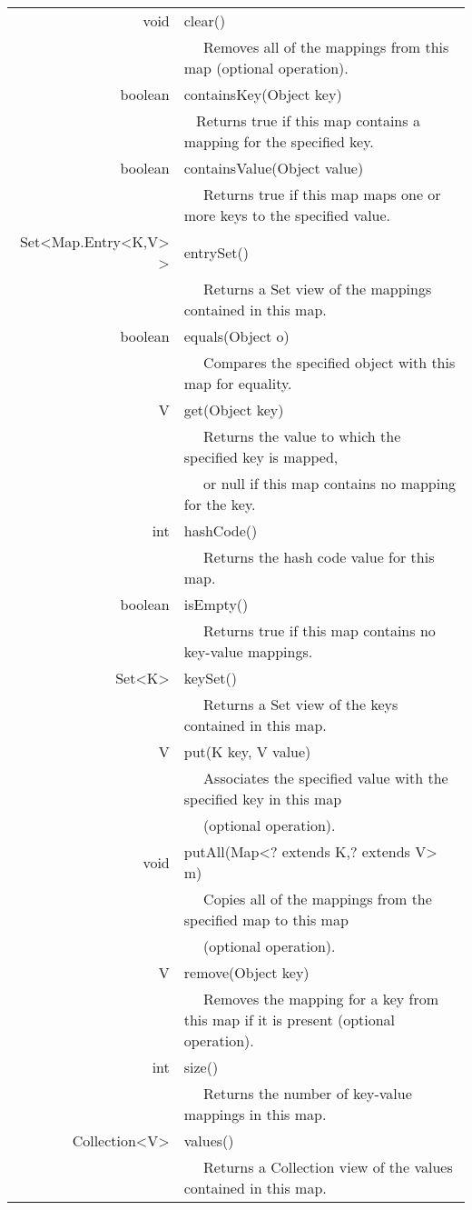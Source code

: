 \documentclass[iutinfo,a4paper,nocorrections,10pt]{ustl-tdtp}
\begin{document}
\begin{center}
\begin{tabular}{|r|l|}
\hline
 void	& clear() \\
        &~~  Removes all of the mappings from this map (optional operation).\\
 \hline
boolean&	containsKey(Object key) \\
        &~  Returns true if this map contains a mapping for the specified key.\\
\hline
 boolean&	containsValue(Object value) \\
        &~~  Returns true if this map maps one or more keys to the specified value.\\
\hline
 Set<Map.Entry<K,V> >&	entrySet() \\
        &~~  Returns a Set view of the mappings contained in this map.\\
\hline
 boolean&	equals(Object o) \\
        &~~  Compares the specified object with this map for equality.\\
\hline
 V	&get(Object key) \\
        &~~ Returns the value to which the specified key is mapped,\\
        &~~ or null if this map contains no mapping for the key.\\
\hline
 int	&hashCode() \\
        &~~  Returns the hash code value for this map.\\
\hline
 boolean&	isEmpty() \\
        &~~  Returns true if this map contains no key-value mappings.\\
\hline
 Set<K>	&keySet() \\
        &~~  Returns a Set view of the keys contained in this map.\\
\hline
 V	&put(K key, V value) \\
        &~~  Associates the specified value with the specified key in this map \\
        &~~ (optional operation).\\
\hline
 void	&putAll(Map<? extends K,? extends V> m) \\
        &~~  Copies all of the mappings from the specified map to this map\\
        &~~ (optional operation).\\
\hline
 V	&remove(Object key) \\
        &~~  Removes the mapping for a key from this map if it is present (optional operation).\\
\hline
 int	&size() \\
        &~~  Returns the number of key-value mappings in this map.\\
\hline
 Collection<V>&	values() \\
          &~~ Returns a Collection view of the values contained in this map.\\
\hline
\end{tabular}
\end{center}
\end{document}
